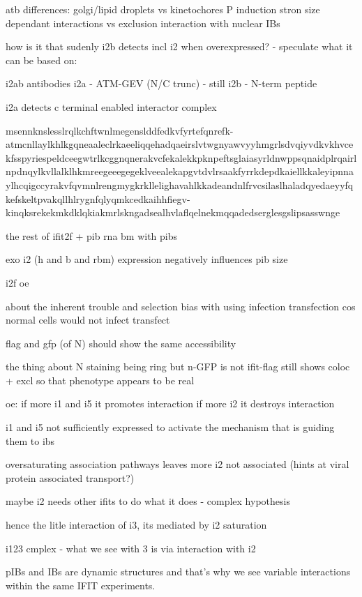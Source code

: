 atb differences:
golgi/lipid droplets vs kinetochores
P induction
stron size dependant interactions vs exclusion
interaction with nuclear IBs

how is it that sudenly i2b detects incl i2 when overexpressed?
- speculate what it can be based on:

i2ab antibodies
i2a - ATM-GEV (N/C trunc) - still 
i2b - N-term peptide

i2a detects c terminal enabled interactor complex

msennknslesslrqlkchftwnlmegenslddfedkvfyrtefqnrefk-atmcnllaylkhlkgqneaaleclrkaeeliqqehadqaeirslvtwgnyawvyyhmgrlsdvqiyvdkvkhvcekfsspyriespeldceegwtrlkcggnqnerakvcfekalekkpknpeftsglaiasyrldnwppsqnaidplrqairlnpdnqylkvllalklhkmreegeeegegeklveealekapgvtdvlrsaakfyrrkdepdkaiellkkaleyipnnaylhcqigccyrakvfqvmnlrengmygkrkllelighavahlkkadeandnlfrvcsilaslhaladqyedaeyyfqkefskeltpvakqllhlrygnfqlyqmkcedkaihhfiegv-kinqksrekekmkdklqkiakmrlskngadsealhvlaflqelnekmqqadedserglesgslipsasswnge

the rest of ifit2f + pib
rna bm with pibs 

exo i2 (h and b and rbm) expression negatively influences pib size

i2f oe

about the inherent trouble and selection bias with using infection transfection cos normal cells would not infect transfect

flag and gfp (of N) should show the same accessibility

the thing about N staining being ring but n-GFP is not
ifit-flag still shows coloc + excl so that phenotype appears to be real

oe:
if more i1 and i5 it promotes interaction
if more i2 it destroys interaction


i1 and i5 not sufficiently expressed to activate the mechanism that is guiding them to ibs

oversaturating association pathways leaves more i2 not associated (hints at viral protein associated transport?)

maybe i2 needs other ifits to do what it does - complex hypothesis

hence the litle interaction of i3, its mediated by i2 saturation

i123 cmplex - what we see with 3 is via interaction with i2

pIBs and IBs are dynamic structures and that's why we see variable interactions within the same IFIT experiments.

